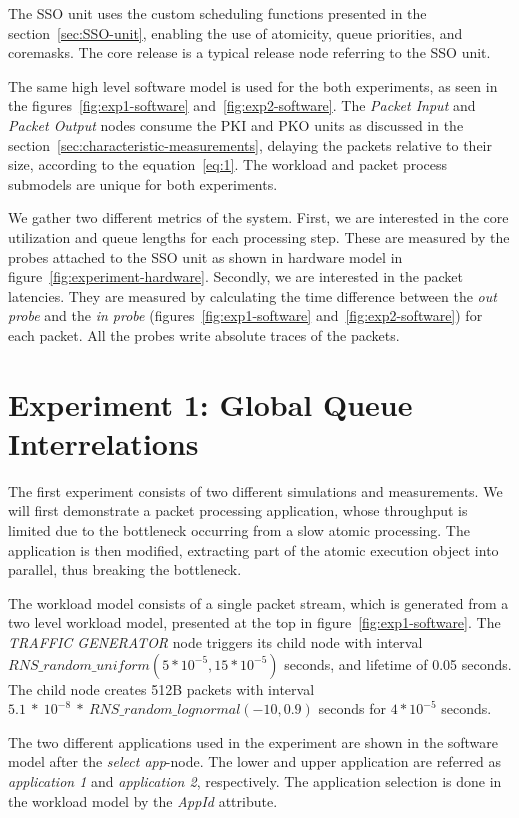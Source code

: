 The SSO unit uses the custom scheduling functions presented in the section~\ref{sec:SSO-unit}, enabling the use of atomicity, queue priorities, and coremasks. The core release is a typical release node referring to the SSO unit.

The same high level software model is used for the both experiments, as seen in the figures~\ref{fig:exp1-software} and~\ref{fig:exp2-software}. The \emph{Packet Input} and \emph{Packet Output} nodes consume the PKI and PKO units as discussed in the section~\ref{sec:characteristic-measurements}, delaying the packets relative to their size, according to the equation~\ref{eq:1}. The workload and packet process submodels are unique for both experiments.

We gather two different metrics of the system. First, we are interested in the core utilization and queue lengths for each processing step. These are measured by the probes attached to the SSO unit as shown in hardware model in figure~\ref{fig:experiment-hardware}. Secondly, we are interested in the packet latencies. They are measured by calculating the time difference between the \emph{out probe} and the \emph{in probe} (figures~\ref{fig:exp1-software} and~\ref{fig:exp2-software}) for each packet. All the probes write absolute traces of the packets.

\section{Experiment 1: Global Queue Interrelations}
The first experiment consists of two different simulations and measurements. We will first demonstrate a packet processing application, whose throughput is limited due to the bottleneck occurring from a slow atomic processing. The application is then modified, extracting part of the atomic execution object into parallel, thus breaking the bottleneck.

The workload model consists of a single packet stream, which is generated from a two level workload model, presented at the top in figure~\ref{fig:exp1-software}. The \emph{TRAFFIC GENERATOR} node triggers its child node with interval $RNS\_random\_uniform(5*10^{-5}, 15*10^{-5})$ seconds, and lifetime of 0.05 seconds. The child node creates 512B packets with interval $5.1~*~10^{-8}~*~RNS\_random\_lognormal(-10, 0.9)$ seconds for $4*10^{-5}$ seconds.

The two different applications used in the experiment are shown in the software model after the \emph{select app}-node. The lower and upper application are referred as \emph{application 1} and \emph{application 2}, respectively. The application selection is done in the workload model by the \emph{AppId} attribute.

